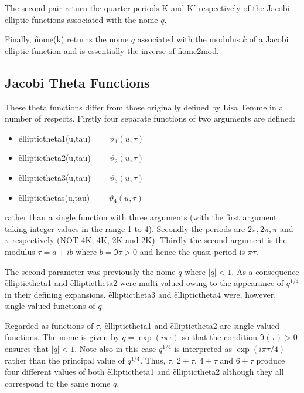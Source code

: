 The second pair return the quarter-periods K and K$'$ respectively of
the Jacobi elliptic functions associated with the nome $q$.

Finally, \f{nome(k)} returns the nome $q$ associated with the modulus $k$ of
a Jacobi elliptic function and is essentially the inverse of \f{nome2mod}.

\subsection{Jacobi Theta Functions}
\hypertarget{JACTF}{}
These theta functions differ from those originally defined by Lisa Temme
in a number of respects.
Firstly four separate functions of two arguments are defined:
\hypertarget{operator:ELLIPTICTHETA1}{}
\hypertarget{operator:ELLIPTICTHETA2}{}
\hypertarget{operator:ELLIPTICTHETA3}{}
\hypertarget{operator:ELLIPTICTHETA4}{}
 
 
\begin{itemize}
\item \f{elliptictheta1(u,tau)} $\qquad \vartheta_1(u, \tau)$
\item \f{elliptictheta2(u,tau)} $\qquad \vartheta_2(u, \tau)$
\item \f{elliptictheta3(u,tau)} $\qquad \vartheta_3(u, \tau)$
\item \f{ellipticthetas(u,tau)} $\qquad \vartheta_4(u, \tau)$
\end{itemize}

rather than a single function with three arguments (with the first argument
taking integer values in the range 1 to 4).
Secondly the periods are $2\pi, 2\pi, \pi$ and $\pi$ respectively
(NOT 4K, 4K, 2K and 2K).
Thirdly the second argument is the modulus $\tau = a+i b$ where $b=\Im\tau>0$
and hence the quasi-period is $\pi\tau$.

The second parameter was previously the nome $q$
where $|q|<1$. As a consequence \f{elliptictheta1} and \f{elliptictheta2} were
multi-valued owing to the appearance of $q^{1/4}$ in their defining expansions.
\f{elliptictheta3} and \f{elliptictheta4} were, however, single-valued
functions of $q$.

Regarded as functions of $\tau$,
\f{elliptictheta1} and \f{elliptictheta2} are single-valued functions. The nome
is given by $q = \exp(i\pi\tau)$  so that the condition $\Im(\tau)>0$ ensures
that $|q| < 1$. Note also  in this case $q^{1/4}$ is interpreted as
$\exp(i\pi\tau/4)$ rather than the principal value of $q^{1/4}$.
Thus, $\tau$, $2+\tau$, $4+\tau$ and $6+\tau$ produce four different values of
both \f{elliptictheta1} and \f{elliptictheta2} although they all correspond to
the same nome $q$.

